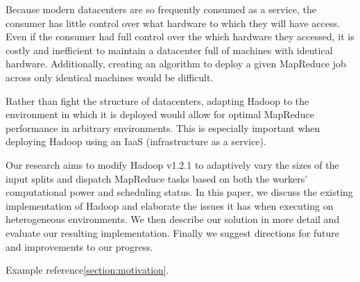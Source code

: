 \documentclass{sig-alternate}
\begin{document}
Because modern datacenters are so frequently consumed as a service, the consumer
has little control over what hardware to which they will have access. Even if the
consumer had full control over the which hardware they accessed, it is costly and
inefficient to maintain a datacenter full of machines with identical hardware. 
Additionally, creating an algorithm to deploy a given MapReduce job across only 
identical machines would be difficult.

Rather than fight the structure of datacenters, adapting Hadoop to the environment
in which it is deployed would allow for optimal MapReduce performance in arbitrary
environments. This is especially important when deploying Hadoop using an IaaS 
(infrastructure as a service).

Our research aims to modify Hadoop v1.2.1 to adaptively vary the sizes of the input
splits and dispatch MapReduce tasks based on both the workers’ computational power
and scheduling status. In this paper, we discuss the existing implementation of Hadoop
and elaborate the issues it has when executing on heterogeneous environments. We then
describe our solution in more detail and evaluate our resulting implementation. Finally
we suggest directions for future and improvements to our progress.

Example reference\ref{section:motivation}.









{}

\end{document}
